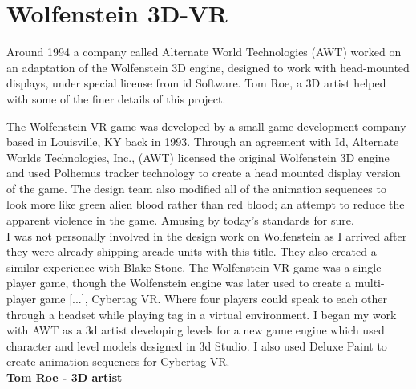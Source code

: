\vspace{-10pt}
\section{Wolfenstein 3D-VR}
Around 1994 a company called Alternate World Technologies (AWT) worked on an adaptation of the Wolfenstein 3D engine, designed to work with head-mounted displays, under special license from id Software. Tom Roe, a 3D artist helped with some of the finer details of this project.\\
\par
\begin{fancyquotes}
The Wolfenstein VR game was developed by a small game development company based in Louisville, KY back in 1993. Through an agreement with Id, Alternate Worlds Technologies, Inc., (AWT) licensed the original Wolfenstein 3D engine and used Polhemus tracker technology to create a head mounted display version of the game. The design team also modified all of the animation sequences to look more like green alien blood rather than red blood; an attempt to reduce the apparent violence in the game. Amusing by today's standards for sure.
 \bigskip \\
I was not personally involved in the design work on Wolfenstein as I arrived after they were already shipping arcade units with this title. They also created a similar experience with Blake Stone. The Wolfenstein VR game was a single player game, though the Wolfenstein engine was later used to create a multi-player game [...], Cybertag VR. Where four players could speak to each other through a headset while playing tag in a virtual environment. I began my work with AWT as a 3d artist developing levels for a new game engine which used character and level models designed in 3d Studio. I also used Deluxe Paint to create animation sequences for Cybertag VR.
 \bigskip \\
\textbf{Tom Roe - 3D artist}\\
 \end{fancyquotes}
\pagebreak





